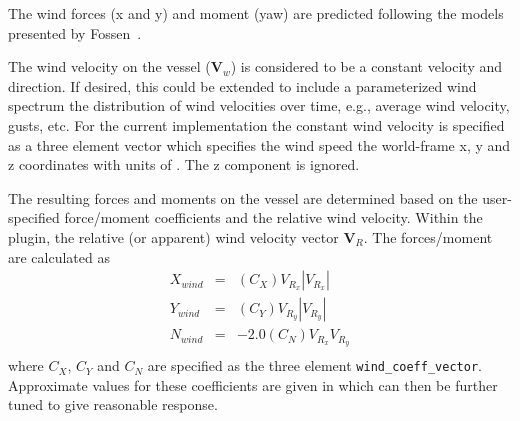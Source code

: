 \documentclass[11pt]{article}
\begin{document}
The wind forces (x and y) and moment (yaw) are predicted following the models presented by Fossen~\cite{fossen94guidance}.

The wind velocity on the vessel ($\mathbf{V}_w$) is considered to be a constant velocity and direction.  If desired, this could be extended to include a parameterized wind spectrum the distribution of wind velocities over time, e.g., average wind velocity, gusts, etc.  For the current implementation the constant wind velocity is specified as a three element vector which specifies the wind speed the world-frame x, y and z coordinates with units of .  The z component is ignored.

The resulting forces and moments on the vessel are determined based on the user-specified force/moment coefficients and the relative wind velocity.  Within the plugin, the relative (or apparent) wind velocity vector $\mathbf{V}_R$.  The forces/moment are calculated as
\begin{eqnarray}
  X_{wind} &=& (C_X) V_{R_x} |V_{R_x}| \\
  Y_{wind} &=& (C_Y) V_{R_y} |V_{R_y}| \\
  N_{wind} &=& -2.0 (C_N) V_{R_x} V_{R_y} \\
\end{eqnarray}
where $C_X$, $C_Y$ and $C_N$ are specified as the three element \verb+wind_coeff_vector+.  Approximate values for these coefficients are given in \cite{sarda17station} which can then be further tuned to give reasonable response.



\end{document}
